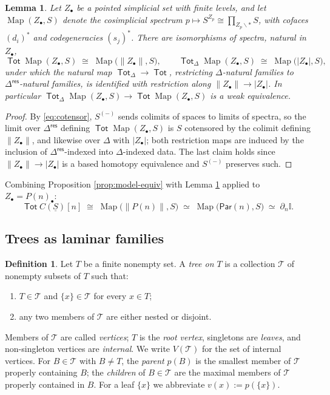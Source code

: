 \documentclass[12pt]{amsart}
\newtheorem{lemma}[subsection]{Lemma}
\theoremstyle{definition}
\newtheorem{definition}[subsection]{Definition}
\theoremstyle{remark}
\newcommand{\Tot}{\operatorname{\mathsf{Tot}}}
\newcommand{\Map}{\operatorname{Map}}
\newcommand{\Id}{\mathbb{I}}
\newcommand{\uS}{\underline{S}}
\newcommand{\Par}{\mathsf{Par}}
\newcommand{\TreeF}{\mathcal{T}}                 %
\newcommand{\fat}[1]{\lVert #1 \rVert}           %
\newcommand{\Dres}{\Delta^{\mathsf{res}}}
\newcommand{\basept}{\ast}
\begin{document}
\begin{lemma}\label{lem:tot-is-map}
Let $Z_{\bullet}$ be a pointed simplicial set with finite levels, and let $\Map(Z_{\bullet}, S)$ denote the cosimplicial spectrum $p\mapsto S^{Z_p} \cong \prod_{Z_p\smallsetminus \basept} S$, with cofaces $(d_i)^{*}$ and codegeneracies $(s_j)^{*}$. There are isomorphisms of spectra, natural in $Z_{\bullet}$,
\[ \Tot \Map(Z_{\bullet}, S) \;\cong\; \Map\big( \fat{Z_{\bullet}}, S \big), \quad\quad
   \Tot_{\Delta} \Map(Z_{\bullet}, S) \;\cong\; \Map\big( |Z_{\bullet}|, S \big),\]
under which the natural map $\Tot_{\Delta}\to \Tot$, restricting $\Delta$-natural families to $\Dres$-natural families, is identified with restriction along $\fat{Z_{\bullet}}\to |Z_{\bullet}|$. In particular $\Tot_{\Delta} \Map(Z_{\bullet}, S)\to \Tot \Map(Z_{\bullet},S)$ is a weak equivalence.
\end{lemma}

\begin{proof}
By \eqref{eq:cotensor}, $S^{(-)}$ sends colimits of spaces to limits of spectra, so the limit over $\Dres$ defining $\Tot\Map(Z_{\bullet},S)$ is $S$ cotensored by the colimit defining $\fat{Z_{\bullet}}$, and likewise over $\Delta$ with $|Z_{\bullet}|$; both restriction maps are induced by the inclusion of $\Dres$-indexed into $\Delta$-indexed data. The last claim holds since $\fat{Z_\bullet}\to|Z_\bullet|$ is a based homotopy equivalence and $S^{(-)}$ preserves such.
\end{proof}

Combining Proposition \ref{prop:model-equiv} with Lemma \ref{lem:tot-is-map} applied to $Z_{\bullet} = P(n)_{\bullet}$:
\begin{equation}\label{eq:tot-fat-model}
    \Tot C(\uS)[n] \;\cong\; \Map\big(\fat{P(n)}, S\big) \;\simeq\; \Map\big(\Par(n), S\big)\;\simeq\; \partial_n\Id .
\end{equation}

\subsection{Trees as laminar families}\label{sec:laminar}

\begin{definition}\label{def:laminar}
Let $T$ be a finite nonempty set. A \emph{tree on $T$} is a collection $\TreeF$ of nonempty subsets of $T$ such that:
\begin{enumerate}[label=(\roman*)]
    \item $T\in \TreeF$ and $\{x\}\in \TreeF$ for every $x\in T$;
    \item any two members of $\TreeF$ are either nested or disjoint.
\end{enumerate}
Members of $\TreeF$ are called \emph{vertices}; $T$ is the \emph{root vertex}, singletons are \emph{leaves}, and non-singleton vertices are \emph{internal}. We write $V(\TreeF)$ for the set of internal vertices. For $B\in \TreeF$ with $B\neq T$, the \emph{parent} $p(B)$ is the smallest member of $\TreeF$ properly containing $B$; the \emph{children} of $B\in\TreeF$ are the maximal members of $\TreeF$ properly contained in $B$. For a leaf $\{x\}$ we abbreviate $v(x) := p(\{x\})$.
\end{definition}
\end{document}
